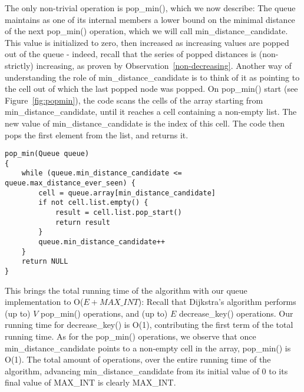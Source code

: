 \documentclass[conference,10pt,twocolumn]{IEEEtran}
\begin{document}
The only non-trivial operation is pop\_min(), which we now describe:
The queue maintains as one of its internal members a lower bound on the minimal distance of the next pop\_min() operation, which we will call min\_distance\_candidate. This value is initialized to zero, then increased as increasing values are popped out of the queue - indeed, recall that the series of popped distances is (non-strictly) increasing, as proven by Observation~\ref{non-decreasing}. Another way of understanding the role of min\_distance\_candidate is to think of it as pointing to the cell out of which the last popped node was popped.
On pop\_min() start (see Figure~\ref{fig:popmin}), the code scans the cells of the array starting from min\_distance\_candidate, until it reaches a cell containing a non-empty list. The new value of min\_distance\_candidate is the index of this cell. The code then pops the first element from the list, and returns it. 

\begin{figure*}[htb]
\begin{center}
\begin{verbatim}
pop_min(Queue queue)
{
    while (queue.min_distance_candidate <= queue.max_distance_ever_seen) {
        cell = queue.array[min_distance_candidate]
        if not cell.list.empty() {
            result = cell.list.pop_start()
            return result
        }
        queue.min_distance_candidate++
    }
    return NULL
}
\end{verbatim}
\end{center}
\caption{A pseudocode for the pop\_min() operation} \label{fig:popmin}
\end{figure*}

This brings the total running time of the algorithm with our queue implementation to O($E + MAX\_INT$): Recall that Dijkstra's algorithm performs (up to) $V$ pop\_min() operations, and (up to) $E$ decrease\_key() operations. Our running time for decrease\_key() is O(1), contributing the first term of the total running time. As for the pop\_min() operations, we observe that once min\_distance\_candidate points to a non-empty cell in the array, pop\_min() is O(1). The total amount of operations, over the entire running time of the algorithm, advancing min\_distance\_candidate from its initial value of 0 to its final value of MAX\_INT is clearly MAX\_INT.
\end{document}
